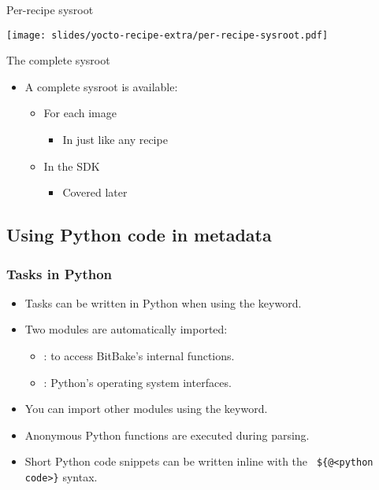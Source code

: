 \begin{frame}{Per-recipe sysroot}
  \begin{center}
    \texttt{[image: slides/yocto-recipe-extra/per-recipe-sysroot.pdf]}
  \end{center}
\end{frame}

\begin{frame}{The complete sysroot}
  \begin{itemize}
  \item A complete sysroot is available:
    \begin{itemize}
      \item For each image
        \begin{itemize}
          \item In  just like any recipe
        \end{itemize}
      \item In the SDK
        \begin{itemize}
          \item Covered later
        \end{itemize}
    \end{itemize}
  \end{itemize}
\end{frame}

\subsection{Using Python code in metadata}

\begin{frame}
  \frametitle{Tasks in Python}
  \begin{itemize}
    \item Tasks can be written in Python when using the 
      keyword.
    \item Two modules are automatically imported:
      \begin{itemize}
        \item {}: to access BitBake's internal functions.
        \item {}: Python's operating system interfaces.
      \end{itemize}
    \item You can import other modules using the 
      keyword.
    \item Anonymous Python functions are executed during parsing.
      \item Short Python code snippets can be written inline with the {\tt
        \$\{@<python code>\}} syntax.
  \end{itemize}
\end{frame}

